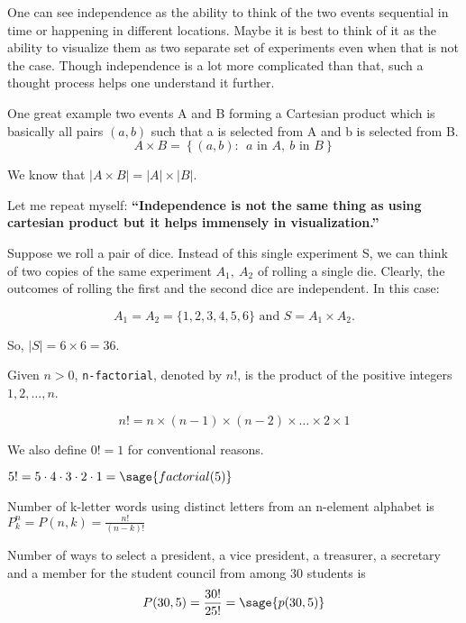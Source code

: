 \documentclass{ximera}
\begin{document}
\begin{remark}
One can see independence as the ability to think of the two events sequential in time or happening in different locations. Maybe it is best to think of it as the ability to visualize them as two separate set of experiments even when that is not the case. Though independence is a lot more complicated than that, such a thought process helps one understand it further.

One great example two events A and B forming a Cartesian product which is basically all pairs $(a,b)$ such that a is selected from A and b is selected from B.
$$A\times B=\left\{ (a,b):~~ a \text{ in } A,~ b \text{ in } B \right\}$$

We know that $|A\times B|=|A|\times |B|$. 

Let me repeat myself: \textbf{``Independence is not the same thing as using cartesian product but it helps immensely in visualization.''}
\end{remark}


\begin{example}
Suppose we roll a pair of dice. Instead of this single experiment S, we can think of two copies of the same experiment $A_1,~A_2$ of rolling a single die. Clearly, the outcomes of rolling the first and the second dice are independent. In this case:

$$A_1=A_2=\{1,2,3,4,5,6\} \text{ and } S=A_1\times A_2.$$

So, $|S|=6\times 6=36$.
\end{example}

\begin{definition}[Factorial]
Given $n>0$, \verb!n-factorial!, denoted by $n!$, is the product of the positive integers $1,2,\ldots, n$.

$$n!=n\times (n-1) \times (n-2) \times \ldots \times 2\times 1$$

We also define $0!=1$ for conventional reasons.
\end{definition}

\begin{example}
$5!=5\cdot 4 \cdot 3 \cdot 2 \cdot 1=\sage{factorial(5)}$
\end{example}
\begin{theorem}
Number of k-letter words using distinct letters from an n-element alphabet is $P_k^n=P(n,k)=\frac{n!}{(n-k)!}$
\end{theorem}

\begin{example}
Number of ways to select a president, a vice president, a treasurer, a secretary and a member for the student council from among 30 students is  
$$
P(30,5)
=
\frac{30!}{25!}
=
\sage{p(30,5)}
$$ 
\end{example}
\end{document}
